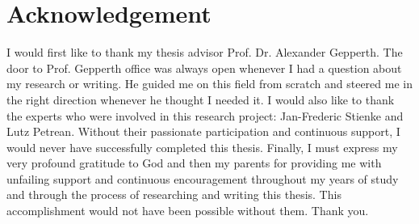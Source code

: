 \chapter*{Acknowledgement}

I would first like to thank my thesis advisor Prof. Dr. Alexander Gepperth. The door to Prof. Gepperth office was always open whenever I had a question about my research or writing. He guided me on this field from scratch and steered me in the right direction whenever he thought I needed it.
\newline
\newline
I would also like to thank the experts who were involved in this research project: Jan-Frederic Stienke and Lutz Petrean. Without their passionate participation and continuous support, I would never have successfully completed this thesis.
\newline
\newline
Finally, I must express my very profound gratitude to God and then my parents for providing me with unfailing support and continuous encouragement throughout my years of study and through the process of researching and writing this thesis. This accomplishment would not have been possible without them. 
\newline
\newline
Thank you.